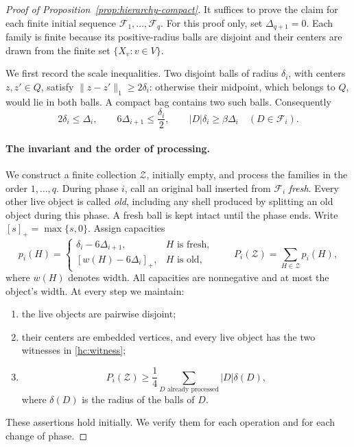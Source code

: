 \documentclass[11pt]{amsart}
\theoremstyle{definition}
\theoremstyle{remark}
\numberwithin{equation}{section}
\begin{document}
\begin{proof}[Proof of Proposition~\ref{prop:hierarchy-compact}]
It suffices to prove the claim for each finite initial sequence
\(\mathcal F_1,\ldots,\mathcal F_q\).  For this proof only, set
\(\Delta_{q+1}=0\).  Each family is finite because its positive-radius
balls are disjoint and their centers are drawn from the finite set
\(\{X_v:v\in V\}\).

We first record the scale inequalities.  Two disjoint balls of radius
\(\delta_i\), with centers \(z,z'\in Q\), satisfy
\(\|z-z'\|_1\ge2\delta_i\): otherwise their midpoint, which belongs
to \(Q\), would lie in both balls.  A compact bag contains two such
balls.  Consequently
\begin{equation}
\label{hc:scales}
 2\delta_i\le\Delta_i,
 \qquad
 6\Delta_{i+1}\le\frac{\delta_i}{2},
 \qquad
 |D|\delta_i\ge \beta\Delta_i
 \quad(D\in\mathcal F_i).
\end{equation}

\paragraph{The invariant and the order of processing.}
We construct a finite collection \(\mathcal Z\), initially empty,
and process the families in the order \(1,\ldots,q\).
During phase \(i\), call an original ball inserted from
\(\mathcal F_i\) \emph{fresh}.  Every other live object is called
\emph{old}, including any shell produced by splitting an old object
during this phase.  A fresh ball is kept intact until the phase ends.
Write \([s]_+=\max\{s,0\}\).  Assign capacities
\begin{equation}
\label{hc:capacity}
 p_i(H)=
 \begin{cases}
  \delta_i-6\Delta_{i+1},&H\text{ is fresh},\\
  [w(H)-6\Delta_i]_+,&H\text{ is old},
 \end{cases}
 \qquad P_i(\mathcal Z)=\sum_{H\in\mathcal Z}p_i(H),
\end{equation}
where \(w(H)\) denotes width.  All capacities are nonnegative and
at most the object's width.  At every step we maintain:
\begin{enumerate}[label=(\roman*),leftmargin=*]
\item the live objects are pairwise disjoint;
\item their centers are embedded vertices, and every live object has
      the two witnesses in \eqref{hc:witness};
\item
\begin{equation}
\label{hc:potential-invariant}
 P_i(\mathcal Z)\ge
 \frac14\sum_{D\text{ already processed}}|D|\delta(D),
\end{equation}
where \(\delta(D)\) is the radius of the balls of \(D\).
\end{enumerate}
These assertions hold initially.  We verify them for each operation
and for each change of phase.


\end{proof}
\end{document}
